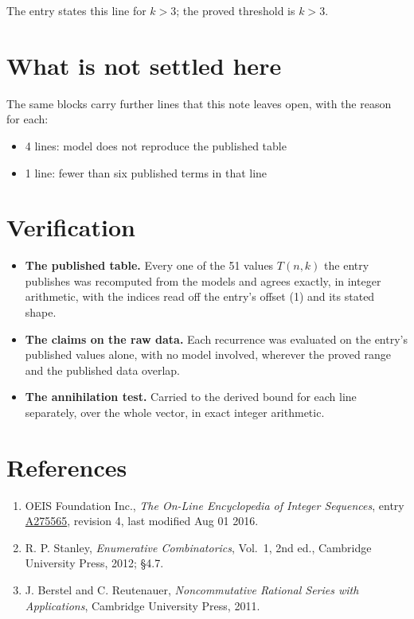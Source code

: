 \documentclass[11pt]{article}
\theoremstyle{definition}
\begin{document}
The entry states this line for $k > 3$; the proved threshold is $k > 3$.

\section{What is not settled here}

The same blocks carry further lines that this note leaves open, with the reason for each:

\begin{itemize}

\item 4 lines: model does not reproduce the published table

\item 1 line: fewer than six published terms in that line

\end{itemize}

\section{Verification}

\begin{itemize}

\item {\bfseries The published table.} Every one of the 51 values $T(n,k)$ the entry publishes was recomputed from the models and agrees exactly, in integer arithmetic, with the indices read off the entry's offset (1) and its stated shape.

\item {\bfseries The claims on the raw data.} Each recurrence was evaluated on the entry's published values alone, with no model involved, wherever the proved range and the published data overlap.

\item {\bfseries The annihilation test.} Carried to the derived bound for each line separately, over the whole vector, in exact integer arithmetic.

\end{itemize}

\section{References}

\begin{enumerate}

\item OEIS Foundation Inc., \emph{The On-Line Encyclopedia of Integer Sequences}, entry \href{https://oeis.org/A275565}{A275565}, revision 4, last modified Aug 01 2016.

\item R. P. Stanley, \emph{Enumerative Combinatorics}, Vol.~1, 2nd ed., Cambridge University Press, 2012; \S4.7.

\item J. Berstel and C. Reutenauer, \emph{Noncommutative Rational Series with Applications}, Cambridge University Press, 2011.

\end{enumerate}
\end{document}
